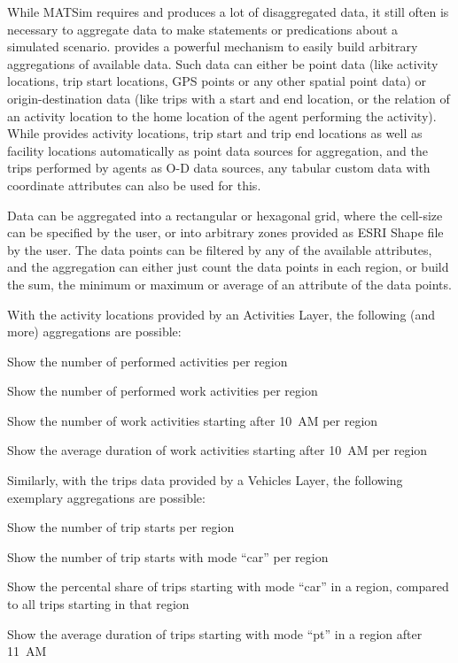 While MATSim requires and produces a lot of disaggregated data, it still often
is necessary to aggregate data to make statements or predications about a
simulated scenario. \Via{} provides a powerful mechanism to easily build
arbitrary aggregations of available data. Such data can either be point data
(like activity locations, trip start locations, GPS points or any other spatial
point data) or origin-destination data (like trips with a start and end
location, or the relation of an activity location to the home location of the
agent performing the activity). While \Via{} provides activity locations, trip
start and trip end locations as well as facility locations automatically as point data
sources for aggregation, and the trips performed by agents as O-D data sources,
any tabular custom data with coordinate attributes can also be used for this. 

Data can be aggregated into a rectangular or hexagonal grid, where the cell-size
can be specified by the user, or into arbitrary zones provided as ESRI
Shape file by the user. The data points can be filtered by any of the
available attributes, and the aggregation can either just count the data points
in each region, or build the sum, the minimum or maximum or average of an
attribute of the data points.

With the activity locations provided by an
Activities Layer, the following (and more) aggregations are possible:
\begin{compactitem}
  \item Show the number of performed activities per region
  \item Show the number of performed work activities per region
  \item Show the number of work activities starting after 10~AM per region
  \item Show the average duration of work activities starting after 10~AM per
  region
\end{compactitem}
Similarly, with the trips data provided by a Vehicles Layer, the following
exemplary aggregations are possible:
\begin{compactitem}
  \item Show the number of trip starts per region
  \item Show the number of trip starts with mode ``car'' per region
  \item Show the percental share of trips starting with mode ``car'' in a
  region, compared to all trips starting in that region
  \item Show the average duration of trips starting with mode ``pt'' in a region
  after 11~AM
\end{compactitem}

